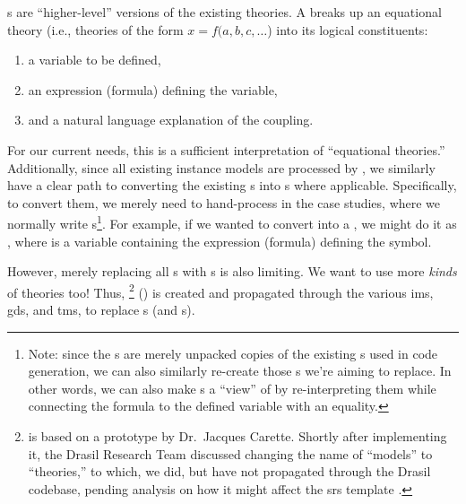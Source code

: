 \originalQDefinitionHaskell{}

\QDefinition{}s are ``higher-level'' versions of the existing theories. A
\QDefinition{} breaks up an equational theory (i.e., theories of the form \(x =
f(a, b, c, \ldots{}\)) into its logical constituents:
\begin{enumerate}
    \item a variable to be defined,
    \item an expression (formula) defining the variable,
    \item and a natural language explanation of the coupling.
\end{enumerate}

For our current needs, this is a sufficient interpretation of ``equational
theories.'' Additionally, since all existing instance models are processed by
\relToQD{}, we similarly have a clear path to converting the existing
\RelationConcept{}s into \QDefinition{}s where applicable. Specifically, to
convert them, we merely need to hand-process \relToQD{} in the case studies,
where we normally write \RelationConcept{}s\footnote{Note: since the
    \QDefinition{}s are merely unpacked copies of the existing \RelationConcept{}s
    used in code generation, we can also similarly re-create those
    \RelationConcept{}s we're aiming to replace. In other words, we can also make
    \RelationConcept{}s a ``view'' of \QDefinition{} by re-interpreting them while
    connecting the formula to the defined variable with an equality.}. For example,
if we wanted to convert  into a \QDefinition, we might do it
as , where  is a variable
containing the expression (formula) defining the  symbol.

\currentLandPosRCtoQD{}

However, merely replacing all \RelationConcept{}s with \QDefinition{}s is also
limiting. We want to use more \textit{kinds} of theories too! Thus,
\ModelKinds{} \footnote{\ModelKinds{} is based on a prototype by Dr.\ Jacques
    Carette. Shortly after implementing it, the Drasil Research Team discussed
    changing the name of ``models'' to ``theories,'' to which, we did, but have not
    propagated through the Drasil codebase, pending analysis on how it might affect
    the \acs{srs} template \cite{DrasilIssue2599RenamingModels}.}
() is created and propagated through the
various \acsp{im}, \acsp{gd}, and \acsp{tm}, to replace \RelationConcept{}s (and
\Relation{}s).

